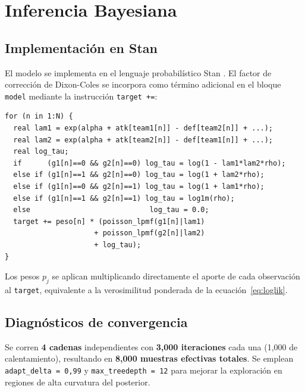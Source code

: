 \documentclass[12pt,a4paper]{article}
\begin{document}
\section{Inferencia Bayesiana}
\label{sec:inference}

\subsection{Implementación en Stan}

El modelo se implementa en el lenguaje probabilístico Stan
\citep{carpenter2017stan}.
El factor de corrección de Dixon-Coles se incorpora como término adicional
en el bloque \texttt{model} mediante la instrucción \texttt{target +=}:

\begin{verbatim}
for (n in 1:N) {
  real lam1 = exp(alpha + atk[team1[n]] - def[team2[n]] + ...);
  real lam2 = exp(alpha + atk[team2[n]] - def[team1[n]] + ...);
  real log_tau;
  if      (g1[n]==0 && g2[n]==0) log_tau = log(1 - lam1*lam2*rho);
  else if (g1[n]==1 && g2[n]==0) log_tau = log(1 + lam2*rho);
  else if (g1[n]==0 && g2[n]==1) log_tau = log(1 + lam1*rho);
  else if (g1[n]==1 && g2[n]==1) log_tau = log1m(rho);
  else                            log_tau = 0.0;
  target += peso[n] * (poisson_lpmf(g1[n]|lam1)
                     + poisson_lpmf(g2[n]|lam2)
                     + log_tau);
}
\end{verbatim}

Los pesos $p_j$ se aplican multiplicando directamente el aporte de cada
observación al \texttt{target}, equivalente a la verosimilitud ponderada
de la ecuación~\eqref{eq:loglik}.

\subsection{Diagnósticos de convergencia}

Se corren \textbf{4 cadenas} independientes con \textbf{3{,}000 iteraciones}
cada una (1{,}000 de calentamiento), resultando en \textbf{8{,}000 muestras
efectivas totales}. Se emplean \texttt{adapt\_delta = 0{,}99} y
\texttt{max\_treedepth = 12} para mejorar la exploración en regiones
de alta curvatura del posterior.
\end{document}
